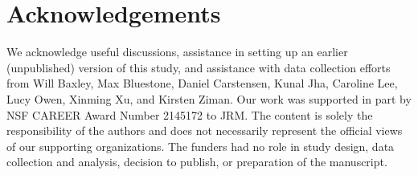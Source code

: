 \documentclass[10pt]{article}
\begin{document}
\section*{Acknowledgements}

We acknowledge useful discussions, assistance in setting up an earlier
(unpublished) version of this study, and assistance with data collection
efforts from Will Baxley, Max Bluestone, Daniel Carstensen, Kunal Jha, Caroline
Lee, Lucy Owen, Xinming Xu, and Kirsten Ziman. Our work was supported in part
by NSF CAREER Award Number 2145172 to JRM. The content is solely the
responsibility of the authors and does not necessarily represent the official
views of our supporting organizations. The funders had no role in study design,
data collection and analysis, decision to publish, or preparation of the
manuscript.





\end{document}
